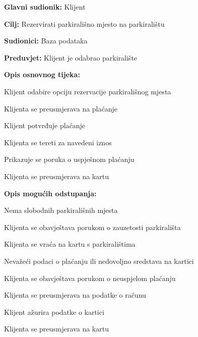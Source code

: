 \noindent {}
\begin{packed_item}
	
	\item \textbf{Glavni sudionik:} Klijent
	\item  \textbf{Cilj:} Rezervirati parkirališno mjesto na parkiralištu
	\item  \textbf{Sudionici:} Baza podataka
	\item  \textbf{Preduvjet:} Klijent je odabrao parkiralište
	\item  \textbf{Opis osnovnog tijeka:}
	
	\item[] \begin{packed_enum}
		
		\item Klijent odabire opciju rezervacije parkirališnog mjesta
		\item Klijenta se preusmjerava na plaćanje
		\item Klijent potvrđuje plaćanje
		\item Klijenta se tereti za navedeni iznos
		\item Prikazuje se poruka o uspješnom plaćanju
		\item Klijenta se preusmjerava na kartu
		
	\end{packed_enum}
	\item  \textbf{Opis mogućih odstupanja:}
	\item[] \begin{packed_item}
		
		\item[1.a] Nema slobodnih parkirališnih mjesta
		\item[] \begin{packed_enum}
			
			\item Klijenta se obavještava porukom o zauzetosti parkirališta
			\item Klijenta se vraća na kartu s parkiralištima
			
		\end{packed_enum}
		
		\item[3.a] Nevažeći podaci o plaćanju ili nedovoljno sredstava na kartici
		\item[] \begin{packed_enum}
			
			\item Klijenta se obavještava porukom o neuspjelom plaćanju
			\item Klijenta se preusmjerava na podatke o računu
			\item Klijent ažurira podatke o kartici
			\item Klijenta se preusmjerava na kartu
			
		\end{packed_enum}
		
	\end{packed_item}
		
\end{packed_item}

